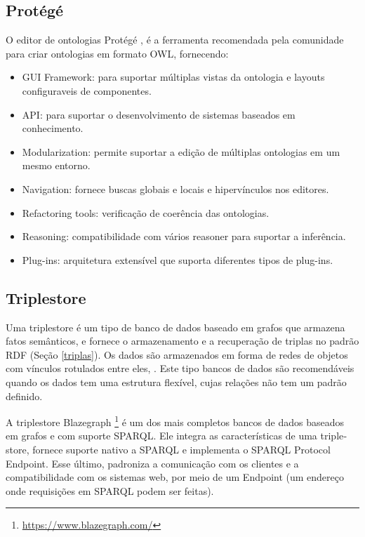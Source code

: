 \subsection*{Protégé}

O editor de ontologias Protégé \citep{musen2015protege}, é a ferramenta
recomendada pela comunidade para criar ontologias em formato \foreignlanguage{english}{OWL},
fornecendo:
%
\begin{itemize}
\item GUI Framework:\foreignlanguage{brazil}{ para suportar múltiplas vistas
da ontologia e layouts configuraveis de componentes.}
\item API:\foreignlanguage{brazil}{ para suportar o desenvolvimento de sistemas
baseados em conhecimento.}
\item Modularization\foreignlanguage{brazil}{: permite suportar a edição
de múltiplas ontologias em um mesmo entorno.}
\item Navigation\foreignlanguage{brazil}{: fornece buscas globais e locais
e hipervínculos nos editores.}
\item Refactoring tools\foreignlanguage{brazil}{: verificação de coerência
das ontologias.}
\item Reasoning:\foreignlanguage{brazil}{ compatibilidade com vários }reasoner\foreignlanguage{brazil}{
para suportar a inferência.}
\item Plug-ins\foreignlanguage{brazil}{: arquitetura extensível que suporta
diferentes tipos de }plug-ins.
\end{itemize}
%

%

\subsection*{Triplestore \label{subsec:Triplestore}}

%
Uma \foreignlanguage{english}{triplestore} é um tipo de banco de dados
baseado em grafos que armazena fatos semânticos, e fornece o armazenamento
e a recuperação de triplas no padrão \foreignlanguage{english}{RDF}
(Seção \ref{triplas}). Os dados são armazenados em forma de redes
de objetos com vínculos rotulados entre eles, \citep{rusher2003triple}.
Este tipo bancos de dados são recomendáveis quando os dados tem uma
estrutura flexível, cujas relações não tem um padrão definido.

A \foreignlanguage{english}{triplestore} \foreignlanguage{english}{Blazegraph}
\footnote{\url{https://www.blazegraph.com/}} é um dos mais completos
bancos de dados baseados em grafos e com suporte SPARQL. Ele integra
as características de uma \foreignlanguage{english}{triplestore},
fornece suporte nativo a \foreignlanguage{english}{SPARQL} e implementa
o \foreignlanguage{english}{SPARQL Protocol Endpoint}. Esse último,
padroniza a comunicação com os clientes e a compatibilidade com os
sistemas web, por meio de \foreignlanguage{english}{um Endpoint} (um
endereço onde requisições em SPARQL podem ser feitas). 

